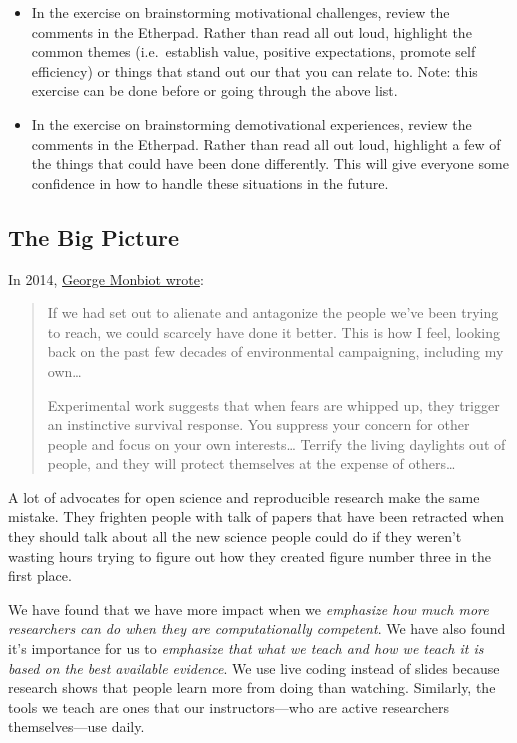 \begin{itemize}
\item
  In the exercise on brainstorming motivational challenges, review the
  comments in the Etherpad. Rather than read all out loud, highlight the
  common themes (i.e.~establish value, positive expectations, promote
  self efficiency) or things that stand out our that you can relate to.
  Note: this exercise can be done before or going through the above
  list.
\item
  In the exercise on brainstorming demotivational experiences, review
  the comments in the Etherpad. Rather than read all out loud, highlight
  a few of the things that could have been done differently. This will
  give everyone some confidence in how to handle these situations in the
  future.
\end{itemize}

\subsection{The Big Picture}\label{the-big-picture}

In 2014,
\href{http://www.theguardian.com/commentisfree/2014/jun/16/saving-the-world-promise-not-fear-nature-environmentalism}{George
Monbiot wrote}:

\begin{quote}
If we had set out to alienate and antagonize the people we've been
trying to reach, we could scarcely have done it better. This is how I
feel, looking back on the past few decades of environmental campaigning,
including my own\ldots{}

Experimental work suggests that when fears are whipped up, they trigger
an instinctive survival response. You suppress your concern for other
people and focus on your own interests\ldots{} Terrify the living
daylights out of people, and they will protect themselves at the expense
of others\ldots{}
\end{quote}

A lot of advocates for open science and reproducible research make the
same mistake. They frighten people with talk of papers that have been
retracted when they should talk about all the new science people could
do if they weren't wasting hours trying to figure out how they created
figure number three in the first place.

We have found that we have more impact when we \emph{emphasize how much
more researchers can do when they are computationally competent}. We
have also found it's importance for us to \emph{emphasize that what we
teach and how we teach it is based on the best available evidence}. We
use live coding instead of slides because research shows that people
learn more from doing than watching. Similarly, the tools we teach are
ones that our instructors---who are active researchers themselves---use
daily.

